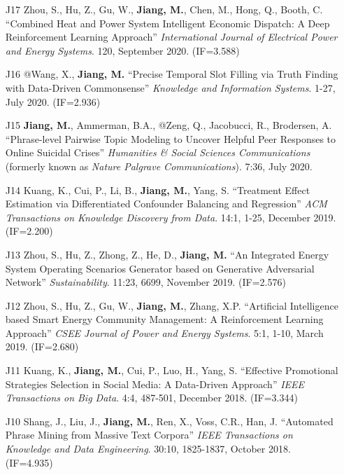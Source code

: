 \documentclass[10pt]{article}
\newenvironment{myindentpar}[1]%
{\begin{list}{}%
         {\setlength{\leftmargin}{#1}}%
         \item[]%
}
{\end{list}}
\newcounter{list}
\begin{document}
\begin{myindentpar}{0.00cm}
\begin{enumerate}[leftmargin=.5cm]
\item[J17] Zhou, S., Hu, Z., Gu, W., \textbf{Jiang, M.}, Chen, M., Hong, Q., Booth, C. ``Combined Heat and Power System Intelligent Economic Dispatch: A Deep Reinforcement Learning Approach'' \textit{International Journal of Electrical Power and Energy Systems}. 120, September 2020. (IF=3.588)

\item[J16] @Wang, X., \textbf{Jiang, M.} ``Precise Temporal Slot Filling via Truth Finding with Data-Driven Commonsense'' \textit{Knowledge and Information Systems}. 1-27, July 2020. (IF=2.936)

\item[J15] \textbf{Jiang, M.}, Ammerman, B.A., @Zeng, Q., Jacobucci, R., Brodersen, A. ``Phrase-level Pairwise Topic Modeling to Uncover Helpful Peer Responses to Online Suicidal Crises'' \textit{Humanities \& Social Sciences Communications} (formerly known as \textit{Nature Palgrave Communications}). 7:36, July 2020.

\item[J14] Kuang, K., Cui, P., Li, B., \textbf{Jiang, M.}, Yang, S. ``Treatment Effect Estimation via Differentiated Confounder Balancing and Regression'' \textit{ACM Transactions on Knowledge Discovery from Data}. 14:1, 1-25, December 2019. (IF=2.200)
	
\item[J13] Zhou, S., Hu, Z., Zhong, Z., He, D., \textbf{Jiang, M.} ``An Integrated Energy System Operating Scenarios Generator based on Generative Adversarial Network'' \textit{Sustainability}. 11:23, 6699, November 2019. (IF=2.576)

\item[J12] Zhou, S., Hu, Z., Gu, W., \textbf{Jiang, M.}, Zhang, X.P. ``Artificial Intelligence based Smart Energy Community Management: A Reinforcement Learning Approach'' \textit{CSEE Journal of Power and Energy Systems}. 5:1, 1-10, March 2019. (IF=2.680)

\item[J11] Kuang, K., \textbf{Jiang, M.}, Cui, P., Luo, H., Yang, S. ``Effective Promotional Strategies Selection in Social Media: A Data-Driven Approach'' \textit{IEEE Transactions on Big Data}. 4:4, 487-501, December 2018. (IF=3.344)

\item[J10] Shang, J., Liu, J., \textbf{Jiang, M.}, Ren, X., Voss, C.R., Han, J. ``Automated Phrase Mining from Massive Text Corpora'' \textit{IEEE Transactions on Knowledge and Data Engineering}. 30:10, 1825-1837, October 2018. (IF=4.935)


\end{enumerate}
\end{myindentpar}
\end{document}
